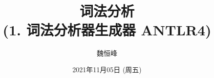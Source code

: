 \documentclass[]{beamer}
\title[词法分析]{词法分析 \\ (1. 词法分析器生成器 ANTLR4)}
\author[魏恒峰]{\large 魏恒峰}
\institute{hfwei@nju.edu.cn}
\date{2021年11月05日 (周五)}
\begin{document}
\maketitle



\thankyou{}

\end{document}
